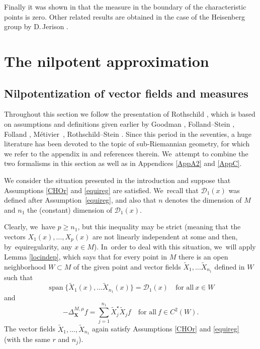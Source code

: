 \documentclass[11pt]{article}
\DeclareMathOperator{\Span}{span}
\newcommand{\bX}{{\boldsymbol{X}}}
\theoremstyle{definition}
\newcommand{\1}{\mathbbm{1}}
\numberwithin{equation}{section}
\begin{document}
Finally it was shown in \cite{De} that the measure in the boundary of the characteristic points is zero. Other related results are obtained in the case of the Heisenberg group by D.\,Jerison \cite{Jer}.

\section{The nilpotent approximation}\label{s1}

\subsection{Nilpotentization of vector fields and measures}
Throughout this section we follow the presentation of Rothschild \cite{Rot}, which is based on assumptions and definitions given earlier by Goodman \cite{Go}, Folland--Stein \cite{FS}, Folland \cite{Fo}, Métivier~\cite{Me}, Rothschild--Stein \cite{RS}. Since this period in the seventies, a huge literature has been devoted to the topic of sub-Riemannian geometry, for which we refer to the appendix in \cite{CHT} and references therein. We~attempt to combine the two formalisms in this section as well as in Appendices \ref{AppA2} and \ref{AppC}.

We consider the situation presented in the introduction and suppose that Assumptions \ref{CHOr} and \ref{equireg} are satisfied. We~recall that $\mathcal D_1(x)$ was defined after Assumption~\ref{equireg}, and also that $n$ denotes the dimension of $M$ and $n_1$ the (constant) dimension of $\mathcal D_1(x)$.

Clearly, we~have $p\geq n_1$, but this inequality may be strict (meaning that the vectors $X_1(x),\ldots,X_p(x)$ are not linearly independent at some and then, by~equiregularity, any $x\in M$). In~order to deal with this situation, we~will apply Lemma \ref{locindep}, which says that for every point in $M$ there is an open neighborhood $W\subset M$ of the given point and vector fields $\tilde X_1,\ldots \tilde X_{n_1}$ defined in $W$ such that
\begin{equation}
\label{eq:loclinindep}
\Span\{ \tilde X_1(x),\ldots \tilde X_{n_1}(x) \} = \mathcal D_1(x)
\quad\text{for all}\ x\in W
\end{equation}
and
\begin{equation}
\label{eq:loclinindeplapl}
-\Delta_\bX^{M,\mu} f = \sum_{j=1}^{n_1} \tilde X_j^\star \tilde X_j f
\quad\text{for all} \ f\in C^2(W).
\end{equation}
The vector fields $\tilde X_1,\ldots,\tilde X_{n_1}$ again satisfy Assumptions \ref{CHOr} and \ref{equireg} (with the same $r$ and $n_j$).
\end{document}
